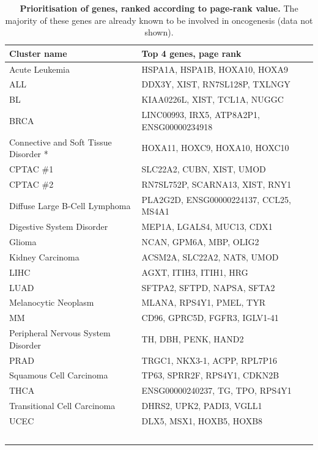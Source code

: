 \begin{table}[H]
	\scriptsize
	\caption{\textbf{Prioritisation of genes, ranked according to page-rank value.} The majority of these genes are already known to be involved in oncogenesis (data not shown).} \label{tab:oncogenes}
	\begin{tabularx}{\linewidth}{XX}
		\hline
		Cluster name & Top 4 genes, page rank \\
		\hline\hline
		Acute Leukemia & HSPA1A, HSPA1B, HOXA10, HOXA9 \\
		ALL & DDX3Y, XIST, RN7SL128P, TXLNGY \\
		BL & KIAA0226L, XIST, TCL1A, NUGGC \\
		BRCA & LINC00993, IRX5, ATP8A2P1, ENSG00000234918 \\
		Connective and Soft Tissue Disorder * & HOXA11, HOXC9, HOXA10, HOXC10 \\
		CPTAC \#1 & SLC22A2, CUBN, XIST, UMOD \\
		CPTAC \#2 & RN7SL752P, SCARNA13, XIST, RNY1 \\
		Diffuse Large B-Cell Lymphoma & PLA2G2D, ENSG00000224137, CCL25, MS4A1 \\
		Digestive System Disorder & MEP1A, LGALS4, MUC13, CDX1 \\
		Glioma & NCAN, GPM6A, MBP, OLIG2 \\
		Kidney Carcinoma & ACSM2A, SLC22A2, NAT8, UMOD \\
		LIHC & AGXT, ITIH3, ITIH1, HRG \\
		LUAD & SFTPA2, SFTPD, NAPSA, SFTA2 \\
		Melanocytic Neoplasm & MLANA, RPS4Y1, PMEL, TYR \\
		MM & CD96, GPRC5D, FGFR3, IGLV1-41 \\
		Peripheral Nervous System Disorder & TH, DBH, PENK, HAND2 \\
		PRAD & TRGC1, NKX3-1, ACPP, RPL7P16 \\
		Squamous Cell Carcinoma & TP63, SPRR2F, RPS4Y1, CDKN2B \\
		THCA & ENSG00000240237, TG, TPO, RPS4Y1 \\
		Transitional Cell Carcinoma & DHRS2, UPK2, PADI3, VGLL1 \\
		UCEC & DLX5, MSX1, HOXB5, HOXB8 \\
		\hline
		\	\end{tabularx}
\end{table}


